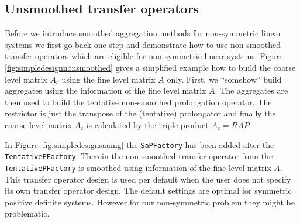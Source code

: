 \documentclass[10pt,fleqn]{book}
\begin{document}
\subsection{Unsmoothed transfer operators}
Before we introduce smoothed aggregation methods for non-symmetric linear systems we first go back one step and demonstrate how to use non-smoothed transfer operators which are eligible for non-symmetric linear systems. Figure \ref{fig:simpledesignnonsmoothed} gives a simplified example how to build the coarse level matrix $A_c$ using the fine level matrix $A$ only. First, we ``somehow'' build aggregates using the information of the fine level matrix $A$. The aggregates are then used to build the tentative non-smoothed prolongation operator. The restrictor is just the transpose of the (tentative) prolongator and finally the coarse level matrix $A_c$ is calculated by the triple product $A_c=RAP$.

In Figure \ref{fig:simpledesignsaamg} the \verb|SaPFactory| has been added after the \verb|TentativePFactory|. Therein the non-smoothed transfer operator from the \verb|TentativePFactory| is smoothed using information of the fine level matrix $A$. This transfer operator design is used per default when the user does not specify its own transfer operator design. The default settings are optimal for symmetric positive definite systems. However for our non-symmetric problem they might be problematic.
\end{document}
